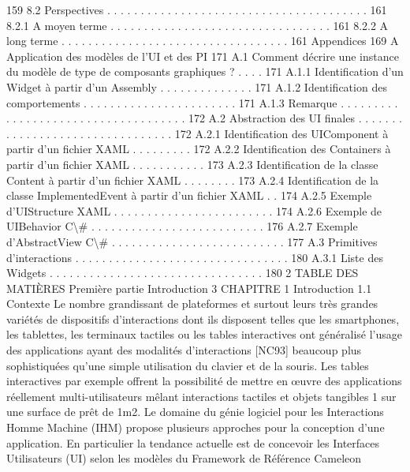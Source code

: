 \documentclass{article}
\begin{document}
159
8.2
Perspectives . . . . . . . . . . . . . . . . . . . . . . . . . . . . . . . . . . . . . . .
161
8.2.1
A moyen terme . . . . . . . . . . . . . . . . . . . . . . . . . . . . . . . . .
161
8.2.2
A long terme . . . . . . . . . . . . . . . . . . . . . . . . . . . . . . . . . .
161
Appendices
169
A Application des mod\`{e}les de l’UI et des PI
171
A.1
Comment d\'{e}crire une instance du mod\`{e}le de type de composants graphiques ? . . . .
171
A.1.1
Identiﬁcation d’un Widget \`{a} partir d’un Assembly
. . . . . . . . . . . . . .
171
A.1.2
Identiﬁcation des comportements
. . . . . . . . . . . . . . . . . . . . . . .
171
A.1.3
Remarque . . . . . . . . . . . . . . . . . . . . . . . . . . . . . . . . . . . .
172
A.2
Abstraction des UI ﬁnales . . . . . . . . . . . . . . . . . . . . . . . . . . . . . . . .
172
A.2.1
Identiﬁcation des UIComponent \`{a} partir d’un ﬁchier XAML . . . . . . . . .
172
A.2.2
Identiﬁcation des Containers \`{a} partir d’un ﬁchier XAML . . . . . . . . . . .
173
A.2.3
Identiﬁcation de la classe Content \`{a} partir d’un ﬁchier XAML . . . . . . . .
173
A.2.4
Identiﬁcation de la classe ImplementedEvent \`{a} partir d’un ﬁchier XAML
. .
174
A.2.5
Exemple d’UIStructure XAML
. . . . . . . . . . . . . . . . . . . . . . . .
174
A.2.6
Exemple de UIBehavior C\textbackslash{}#
. . . . . . . . . . . . . . . . . . . . . . . . . .
176
A.2.7
Exemple d’AbstractView C\textbackslash{}# . . . . . . . . . . . . . . . . . . . . . . . . . .
177
A.3
Primitives d’interactions
. . . . . . . . . . . . . . . . . . . . . . . . . . . . . . . .
180
A.3.1
Liste des Widgets . . . . . . . . . . . . . . . . . . . . . . . . . . . . . . . .
180
2
TABLE DES MATIÈRES
Premi\`{e}re partie
Introduction
3
CHAPITRE 1
Introduction
1.1
Contexte
Le nombre grandissant de plateformes et surtout leurs tr\`{e}s grandes vari\'{e}t\'{e}s de dispositifs d’interactions dont ils disposent telles que les smartphones, les tablettes, les terminaux tactiles ou les tables
interactives ont g\'{e}n\'{e}ralis\'{e} l’usage des applications ayant des modalit\'{e}s d’interactions [NC93] beaucoup plus sophistiqu\'{e}es qu’une simple utilisation du clavier et de la souris. Les tables interactives par
exemple offrent la possibilit\'{e} de mettre en œuvre des applications r\'{e}ellement multi-utilisateurs m\^{e}lant
interactions tactiles et objets tangibles 1 sur une surface de pr\^{e}t de 1m2.
Le domaine du g\'{e}nie logiciel pour les Interactions Homme Machine (IHM) propose plusieurs
approches pour la conception d’une application. En particulier la tendance actuelle est de concevoir les Interfaces Utilisateurs (UI) selon les mod\`{e}les du Framework de R\'{e}f\'{e}rence Cameleon
\end{document}
